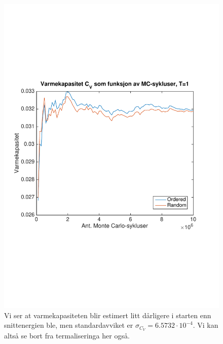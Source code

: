 \documentclass[norsk, 10pt]{article}
\begin{document}
\begin{figure}[H]
\centering
\includegraphics[scale = 0.6, trim = 1cm 8cm 1cm 8cm]{b_varmekap_MC_L2_T1.pdf}
\caption{Vi ser at varmekapasiteten blir estimert litt dårligere i starten enn snittenergien ble, men standardavviket er $\sigma_{C_V} = 6.5732\cdot10^{-4}$. Vi kan altså se bort fra termaliseringa her også.}
\label{fig:varmekapT1}
\end{figure}
\end{document}
